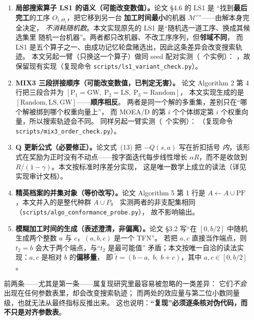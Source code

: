 \documentclass[UTF8, a4paper, 11pt]{ctexart}
\begin{document}
\begin{enumerate}\itemsep1pt
\item \textbf{局部搜索算子 LS1 的语义（可能改变数值）。}论文 \S4.6 的 LS1 是
      “找到\textbf{最后完工}的工序 $O_{i,\Theta_i}$，把它移到另一台
      \textbf{加工时间最小}的机器 $\mathcal{M}'$”——由解本身完全决定，
      \emph{不消耗随机数}。本文实现原先的 LS1 是“随机选一道工序、换成其候选集里
      随机一台机器”。两者都只改机器、不改工序序列，但\textbf{邻域不同}，
      而 LS1 是五个算子之一、由成功记忆轮盘赌选出，因此这条差异会改变搜索轨迹。
      本文另起一臂（只换这一个算子）做同 seed 配对实测（\LsOneVarN\ 个实例）：
      \LsOneVarVerdict，故保留现有实现（复现命令
      \texttt{scripts/ls1\_variant\_check.py}）。
\item \textbf{MIX3 三段拼接顺序（可能改变数值，已判定无害）。}
      论文 Algorithm 2 第 4 行把三段合并为
      $[\text{P}_1{=}\text{GW},\ \text{P}_2{=}\text{LS},\ \text{P}_3{=}\text{Random}]$，
      本文实现生成的是 $[\text{Random},\text{LS},\text{GW}]$——\textbf{顺序相反}。
      两者是同一个解的多重集，差别只在“哪个解被绑到哪个权重向量上”，
      而 MOEA/D 的第 $i$ 个个体绑定第 $i$ 个权重向量，所以搜索轨迹会不同。
      同样另起一臂实测（\MixOrderN\ 个实例）：\MixOrderVerdict
      （复现命令 \texttt{scripts/mix3\_order\_check.py}）。
\item \textbf{Q 更新公式（必要修正）。}论文式~(13) 把 $-Q(s,a)$ 写在折扣括号
      \emph{内}，该形式在奖励为正时没有不动点——按字面迭代每步线性增长
      $\alpha R$，而不是收敛到 $R/(1-\gamma)$。本文按标准时序差分实现，
      这是唯一数学上成立的读法（详见实现审计文档）。
\item \textbf{精英档案的并集对象（等价改写）。}论文 Algorithm 5 第 1 行是
      $A\leftarrow A\cup \mathrm{PF}$，本文并入的是整代种群 $A\cup P$。
      实测两者的非支配集相同（\texttt{scripts/algo\_conformance\_probe.py}），
      故不影响输出。
\item \textbf{模糊加工时间的生成（表述澄清，非偏离）。}论文 \S3.2 写“在 $[0,b/2]$
      中随机生成两个整数 $a$ 与 $c$，$(a,b,c)$ 是一个 TFN”。
      若把 $a,c$ 直接当作端点，则 $t_2=b$ 会大于两个端点，与“$t_2$ 是最可能值”
      矛盾；本文按唯一自洽的读法实现：$a,c$ 是相对 $b$ 的\textbf{偏移量}，
      即 $\tilde t=(b-a,\;b,\;b+c)$，其中 $a,c\in[0,b/2]$。
\end{enumerate}

前两条——尤其是第一条——属复现研究里最容易被忽略的一类差异：
它们\emph{不会}出现在任何参数表里，却会改变搜索轨迹；
而两处的效应量与第二位小数同量级，也就无法从最终指标反推出来。
这也说明：\textbf{“复现”必须逐条核对伪代码，而不只是对齐参数表}。
\end{document}
